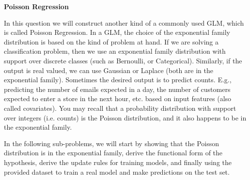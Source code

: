 \item {\bf Poisson Regression}

In this question we will construct another kind of a commonly used GLM, which is called Poisson Regression. In a GLM, the choice of the exponential family distribution is based on the kind of problem at hand. If we are solving a classification problem, then we use an exponential family distribution with support over discrete classes (such as Bernoulli, or Categorical). Similarly, if the output is real valued, we can use Gaussian or Laplace (both are in the exponential family). Sometimes the desired output is to predict counts. E.g., predicting the number of emails expected in a day, the number of customers expected to enter a store in the next hour, etc. based on input features (also called covariates). You may recall that a probability distribution with support over integers (i.e. counts) is the Poisson distribution, and it also happens to be in the exponential family.

In the following sub-problems, we will start by showing that the Poisson distribution is in the exponential family, derive the functional form of the hypothesis, derive the update rules for training models, and finally using the provided dataset to train a real model and make predictions on the test set.

\begin{enumerate}
	
	
	
	
\end{enumerate}
